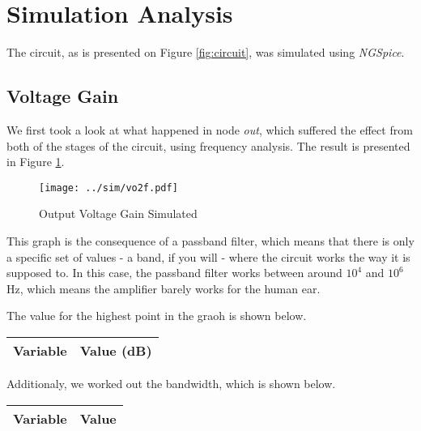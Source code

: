 \clearpage

\section{Simulation Analysis}
\label{sec:simulation}

The circuit, as is presented on Figure \ref{fig:circuit}, was simulated using \textit{NGSpice}.

\vspace{-0.2cm}

\subsection{Voltage Gain}

We first took a look at what happened in node \textit{out}, which suffered the effect from both of the stages of the circuit, using frequency analysis. The result is presented in Figure \ref{fig:vo2f}.

\vspace{-3cm}

\begin{figure}[h] \centering
\texttt{[image: ../sim/vo2f.pdf]}
\caption{Output Voltage Gain Simulated}
\label{fig:vo2f}
\end{figure}

This graph is the consequence of a passband filter, which means that there is only a specific set of values - a band, if you will - where the circuit works the way it is supposed to. In this case, the passband filter works between around $10^4$ and $10^6$ Hz, which means the amplifier barely works for the human ear.

The value for the highest point in the graoh is shown below.

\begin{tabular}{|l|r|}
  \hline    
  {\bf Variable} & {\bf Value (dB)} \\ \hline
  
\end{tabular}

Additionaly, we worked out the bandwidth, which is shown below.

\vspace{0.4cm}

\begin{center}
\begin{tabular}{|l|r|}
  \hline    
  {\bf Variable} & {\bf Value} \\ \hline
  
\end{tabular}
\end{center}


